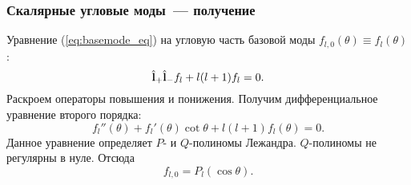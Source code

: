 \documentclass{beamer}
\begin{document}
    \begin{frame}\frametitle{Скалярные угловые моды~--- получение}

        Уравнение (\autoref{eq:basemode_eq}) на угловую часть базовой моды $f_{l,0}(\theta) \equiv f_l(\theta)$:
        \begin{equation}
            \hat{\mathbf{l}}_{+} \hat{\mathbf{l}}_{-} f_l + l (l + 1) f_l = 0 .
        \end{equation}
        Раскроем операторы повышения и понижения. Получим дифференциальное уравнение второго порядка:
        \begin{equation}
            f_l''(\theta) + f_l'(\theta) \cot \theta + l (l + 1) f_l(\theta) = 0 .
        \end{equation}
        Данное уравнение определяет $P$- и $Q$-полиномы Лежандра. $Q$-полиномы не регулярны в нуле. Отсюда
        \begin{equation}\label{eq:basemode_angle}
            f_{l,0} = P_l(\cos\theta) .
        \end{equation}

    \end{frame}

\end{document}
